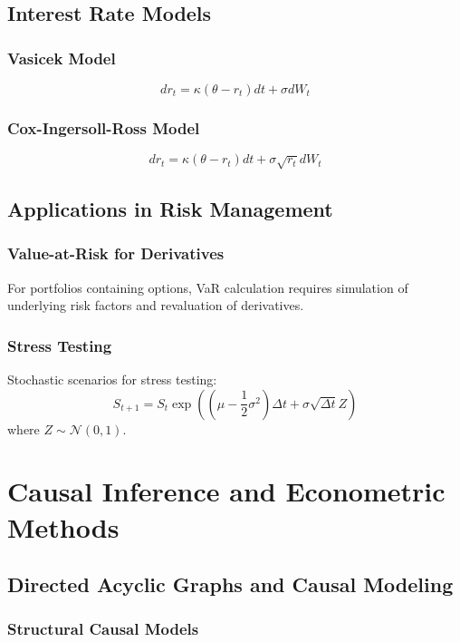 \documentclass[11pt,letterpaper,openany]{book}
\begin{document}
\subsection{Interest Rate Models}

\subsubsection{Vasicek Model}
\[
dr_t = \kappa (\theta - r_t) dt + \sigma dW_t
\]

\subsubsection{Cox-Ingersoll-Ross Model}
\[
dr_t = \kappa (\theta - r_t) dt + \sigma \sqrt{r_t} dW_t
\]

\subsection{Applications in Risk Management}

\subsubsection{Value-at-Risk for Derivatives}

For portfolios containing options, VaR calculation requires simulation of underlying risk factors and revaluation of derivatives.

\subsubsection{Stress Testing}

Stochastic scenarios for stress testing:
\[
S_{t+1} = S_t \exp\left( (\mu - \frac{1}{2}\sigma^2)\Delta t + \sigma \sqrt{\Delta t} Z \right)
\]
where $Z \sim \mathcal{N}(0,1)$.

\section{Causal Inference and Econometric Methods}

\subsection{Directed Acyclic Graphs and Causal Modeling}

\subsubsection{Structural Causal Models}
\end{document}
